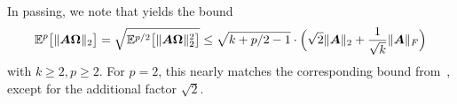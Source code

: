 In passing, we note that   yields the bound
    \begin{equation}
        \mathbb{E}^{p}\big[ \lVert \boldsymbol{A} \boldsymbol{\Omega} \rVert _2 \big] = \sqrt{\mathbb{E}^{p/2}\big[ \lVert \boldsymbol{A} \boldsymbol{\Omega} \rVert _2^2 \big]} \leq \sqrt{k + p/2-1} \cdot \Big(\sqrt{2} \lVert \boldsymbol{A} \rVert _2 + \frac{1}{\sqrt{k}}\lVert \boldsymbol{A} \rVert_F\Big)
    \end{equation}
    with $k\ge 2, p\ge 2$. For $p = 2$, this nearly matches the corresponding bound from~\cite[Lemma B.1]{tropp-2023-randomized-algorithms}, except for the additional factor $\sqrt{2}$.

\color{black}
%
%
%
